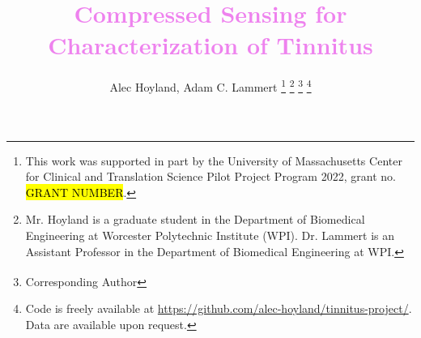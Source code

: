 \documentclass[journal]{IEEEtran}
\begin{document}
%
\title{\textcolor{violet}{Compressed Sensing for Characterization of Tinnitus\vspace{0.25cm}}}

%
%
%

\author{Alec Hoyland, Adam C. Lammert\textsuperscript{\textdagger{}}%
\thanks{This work was supported in part by the University of Massachusetts
Center for Clinical and Translation Science Pilot Project Program 2022,
grant no. \hl{GRANT NUMBER}.}%
\thanks{Mr. Hoyland is a graduate student in the Department of Biomedical Engineering
at Worcester Polytechnic Institute (WPI).
Dr. Lammert is an Assistant Professor in the Department of Biomedical Engineering at WPI.}%
\thanks{\textsuperscript{\textdagger{}} Corresponding Author}%
\thanks{Code is freely available at \protect\url{https://github.com/alec-hoyland/tinnitus-project/}.
Data are available upon request.}}
\end{document}
